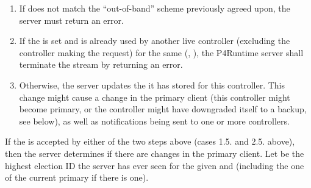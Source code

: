 \documentclass[11pt]{article}
\begin{document}
{\begin{enumerate}
\begin{enumerate}
\item{}
If  does not match the \textquotedblleft{}out-of-band\textquotedblright{} scheme previously
agreed upon, the server must return an  error.%

\item{}
If the  is set and is already used by another live
controller (excluding the controller making the request) for the same
(, ), the P4Runtime server shall terminate the stream
by returning an  error.%

\item{}
Otherwise, the server updates the  it has stored for this
controller. This change might cause a change in the primary client (this
controller might become primary, or the controller might have downgraded
itself to a backup, see below), as well as notifications being sent to
one or more controllers.%
\end{enumerate}%
\end{enumerate}%

\noindent{}If the  is accepted by either of the two steps above
(cases 1.5. and 2.5. above), then the server determines if there are changes in
the primary client. Let  be the highest election ID the server
has ever seen for the given  and  (including the one of the
current primary if there is one).%

}
\end{document}
